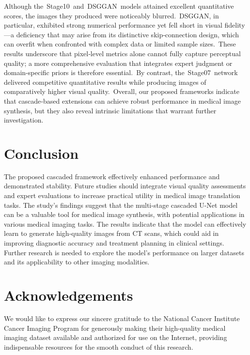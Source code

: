 \documentclass[a4paper, times, 10pt,twocolumn]{article}
\begin{document}
Although the Stage10 and DSGGAN models attained excellent quantitative scores, the images they produced were noticeably blurred. DSGGAN, in particular, exhibited strong numerical performance yet fell short in visual fidelity—a deficiency that may arise from its distinctive skip‑connection design, which can overfit when confronted with complex data or limited sample sizes. These results underscore that pixel‑level metrics alone cannot fully capture perceptual quality; a more comprehensive evaluation that integrates expert judgment or domain‑specific priors is therefore essential. By contrast, the Stage07 network delivered competitive quantitative results while producing images of comparatively higher visual quality. Overall, our proposed frameworks indicate that cascade‑based extensions can achieve robust performance in medical image synthesis, but they also reveal intrinsic limitations that warrant further investigation.

\section{Conclusion}
The proposed cascaded framework effectively enhanced performance and demonstrated stability. Future studies should integrate visual quality assessments and expert evaluations to increase practical utility in medical image translation tasks. The study's findings suggest that the multi-stage cascaded U-Net model can be a valuable tool for medical image synthesis, with potential applications in various medical imaging tasks. The results indicate that the model can effectively learn to generate high-quality images from CT scans, which could aid in improving diagnostic accuracy and treatment planning in clinical settings. Further research is needed to explore the model's performance on larger datasets and its applicability to other imaging modalities.

\section*{Acknowledgements}
We would like to express our sincere gratitude to the National Cancer Institute Cancer Imaging Program for generously making their high-quality medical imaging dataset available and authorized for use on the Internet, providing indispensable resources for the smooth conduct of this research.


% 


%
%


\end{document}
